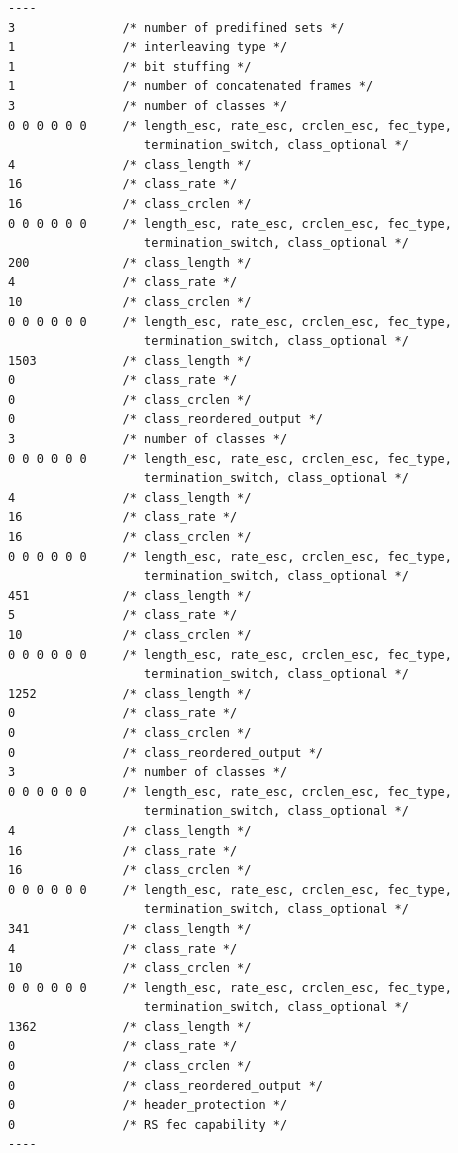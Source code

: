 \documentclass[a4paper]{article}
\begin{document}
\begin{verbatim}
----
3               /* number of predifined sets */
1               /* interleaving type */
1               /* bit stuffing */
1               /* number of concatenated frames */
3               /* number of classes */
0 0 0 0 0 0     /* length_esc, rate_esc, crclen_esc, fec_type, 
                   termination_switch, class_optional */
4               /* class_length */
16              /* class_rate */
16              /* class_crclen */
0 0 0 0 0 0     /* length_esc, rate_esc, crclen_esc, fec_type, 
                   termination_switch, class_optional */
200             /* class_length */
4               /* class_rate */
10              /* class_crclen */
0 0 0 0 0 0     /* length_esc, rate_esc, crclen_esc, fec_type, 
                   termination_switch, class_optional */
1503            /* class_length */
0               /* class_rate */
0               /* class_crclen */
0               /* class_reordered_output */
3               /* number of classes */
0 0 0 0 0 0     /* length_esc, rate_esc, crclen_esc, fec_type, 
                   termination_switch, class_optional */
4               /* class_length */
16              /* class_rate */
16              /* class_crclen */
0 0 0 0 0 0     /* length_esc, rate_esc, crclen_esc, fec_type, 
                   termination_switch, class_optional */
451             /* class_length */
5               /* class_rate */
10              /* class_crclen */
0 0 0 0 0 0     /* length_esc, rate_esc, crclen_esc, fec_type, 
                   termination_switch, class_optional */
1252            /* class_length */
0               /* class_rate */
0               /* class_crclen */
0               /* class_reordered_output */
3               /* number of classes */
0 0 0 0 0 0     /* length_esc, rate_esc, crclen_esc, fec_type, 
                   termination_switch, class_optional */
4               /* class_length */
16              /* class_rate */
16              /* class_crclen */
0 0 0 0 0 0     /* length_esc, rate_esc, crclen_esc, fec_type, 
                   termination_switch, class_optional */
341             /* class_length */
4               /* class_rate */
10              /* class_crclen */
0 0 0 0 0 0     /* length_esc, rate_esc, crclen_esc, fec_type, 
                   termination_switch, class_optional */
1362            /* class_length */
0               /* class_rate */
0               /* class_crclen */
0               /* class_reordered_output */
0               /* header_protection */
0               /* RS fec capability */
----
\end{verbatim}
\end{document}
